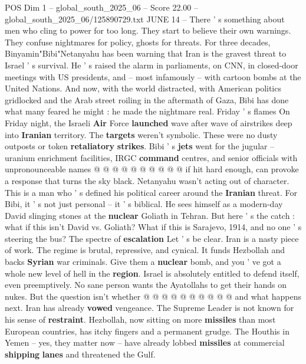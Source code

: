 \begin{textsample}{POS Dim 1 – global\_south\_2025\_06 – Score 22.00 – global\_south\_2025\_06/125890729.txt}  \label{ex:f1_pos_215}
JUNE 14 -- There ' s something about men who cling to power for too long.
They start to believe their own warnings.
They confuse nightmares for policy, ghosts for threats.
For three decades, Binyamin"Bibi"Netanyahu has been warning that Iran is the gravest threat to Israel ' s survival.
He ' s raised the alarm in parliaments, on CNN, in closed-door meetings with US presidents, and -- most infamously -- with cartoon bombs at the United Nations.
And now, with the world distracted, with American politics gridlocked and the Arab street roiling in the aftermath of Gaza, Bibi has done what many feared he might : he made the nightmare real.
Friday ' s flames On Friday night, the Israeli \textbf{Air} Force \textbf{launched} wave after wave of airstrikes deep into \textbf{Iranian} territory.
The \textbf{targets} weren't symbolic.
These were no dusty outposts or token \textbf{retaliatory} \textbf{strikes}.
Bibi ' s \textbf{jets} went for the jugular -- uranium enrichment facilities, IRGC \textbf{command} centres, and senior officials with unpronounceable names @ @ @ @ @ @ @ @ @ @ if hit hard enough, can provoke a response that turns the sky black.
Netanyahu wasn't acting out of character.
This is a man who ' s defined his political career around the \textbf{Iranian} threat.
For Bibi, it ' s not just personal -- it ' s biblical.
He sees himself as a modern-day David slinging stones at the \textbf{nuclear} Goliath in Tehran.
But here ' s the catch : what if this isn't David vs.
Goliath?
What if this is Sarajevo, 1914, and no one ' s steering the bus?
The spectre of \textbf{escalation} Let ' s be clear.
Iran is a nasty piece of work.
The regime is brutal, repressive, and cynical.
It funds Hezbollah and backs \textbf{Syrian} war criminals.
Give them a \textbf{nuclear} bomb, and you ' ve got a whole new level of hell in the \textbf{region}.
Israel is absolutely entitled to defend itself, even preemptively.
No sane person wants the Ayatollahs to get their hands on nukes.
But the question isn't whether @ @ @ @ @ @ @ @ @ @ and what happens next.
Iran has already \textbf{vowed} vengeance.
The Supreme Leader is not known for his sense of \textbf{restraint}.
Hezbollah, now sitting on more \textbf{missiles} than most European countries, has itchy fingers and a permanent grudge.
The Houthis in Yemen -- yes, they matter now -- have already lobbed \textbf{missiles} at commercial \textbf{shipping} \textbf{lanes} and threatened the Gulf.

\end{textsample}
